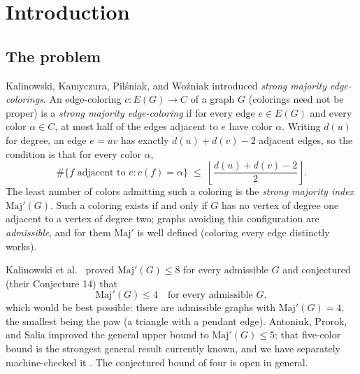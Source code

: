 \documentclass[11pt]{article}
\theoremstyle{definition}
\theoremstyle{remark}
\newcommand{\Maj}{\ensuremath{\mathrm{Maj}'}}
\begin{document}
\begin{abstract}
it as such. At $t \le 2$ degree-3 vertices a migration argument replaces the descent lemma entirely, which is how the unconditional mixed-slice theorem closes. The verification rests on a toolkit of more than one hundred kernel-checked declarations---a split/defect/trail calculus for degree-$\{3,4\}$ graphs. We also record, as methodology, an alternative architecture based on edge-potential minimization that our own verification gates found promising and then falsified with explicit counterexamples, together with a table of eight refuted structural hypotheses each carrying a machine-checked witness. The work builds on, and reuses the frozen definitions of, our earlier five-color verification.
\end{abstract}

\section{Introduction}\label{1-introduction}

\subsection{The problem}\label{11-the-problem}

Kalinowski, Kamyczura, Pilśniak, and Woźniak \cite{KKPW} introduced \emph{strong majority edge-colorings}. An edge-coloring $c \colon E(G) \to C$ of a graph $G$ (colorings need not be proper) is a \emph{strong majority edge-coloring} if for every edge $e \in E(G)$ and every color $\alpha \in C$, at most half of the edges adjacent to $e$ have color $\alpha$. Writing $d(u)$ for degree, an edge $e = uv$ has exactly $d(u) + d(v) - 2$ adjacent edges, so the condition is that for every color $\alpha$,
\[
\#\{f \text{ adjacent to } e : c(f) = \alpha\} \;\le\; \left\lfloor \frac{d(u)+d(v)-2}{2} \right\rfloor .
\]
The least number of colors admitting such a coloring is the \emph{strong majority index} $\Maj(G)$. Such a coloring exists if and only if $G$ has no vertex of degree one adjacent to a vertex of degree two; graphs avoiding this configuration are \emph{admissible}, and for them $\Maj$ is well defined (coloring every edge distinctly works).

Kalinowski et al.\ \cite{KKPW} proved $\Maj(G) \le 8$ for every admissible $G$ and conjectured (their Conjecture 14) that
\[
\Maj(G) \le 4 \quad \text{for every admissible } G,
\]
which would be best possible: there are admissible graphs with $\Maj(G) = 4$, the smallest being the paw (a triangle with a pendant edge). Antoniuk, Prorok, and Salia \cite{APS} improved the general upper bound to $\Maj(G) \le 5$; that five-color bound is the strongest general result currently known, and we have separately machine-checked it \cite{E5}. The conjectured bound of four is open in general.
\end{document}
